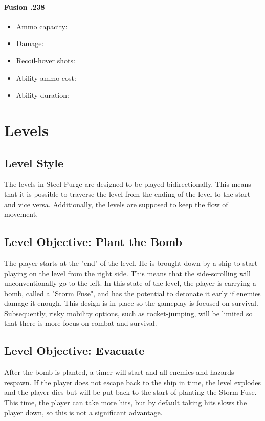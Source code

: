 \documentclass[12pt]{article}
\begin{document}
\paragraph{Fusion .238}

\begin{itemize}
	\item Ammo capacity: 
	\item Damage: 
	\item Recoil-hover shots: 
	\item Ability ammo cost: 
	\item Ability duration: 
\end{itemize}

\section{Levels}

\subsection{Level Style}

The levels in Steel Purge are designed to be played bidirectionally. This means that it is possible to traverse the level from the ending of the level to the start and vice versa. Additionally, the levels are supposed to keep the flow of movement. 

\subsection{Level Objective: Plant the Bomb}

The player starts at the "end" of the level. He is brought down by a ship to start playing on the level from the right side. This means that the side-scrolling will unconventionally go to the left. In this state of the level, the player is carrying a bomb, called a "Storm Fuse", and has the potential to detonate it early if enemies damage it enough. This design is in place so the gameplay is focused on survival. Subsequently, risky mobility options, such as rocket-jumping, will be limited so that there is more focus on combat and survival. 

\subsection{Level Objective: Evacuate}

After the bomb is planted, a timer will start and all enemies and hazards respawn. If the player does not escape back to the ship in time, the level explodes and the player dies but will be put back to the start of planting the Storm Fuse. This time, the player can take more hits, but by default taking hits slows the player down, so this is not a significant advantage. 
\end{document}
